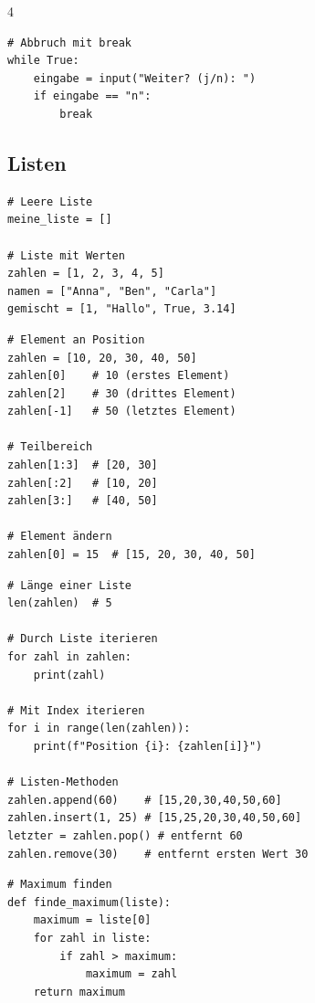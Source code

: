 \begin{landscape}
\begin{multicols*}{4}
\begin{cheatSheetBox}[title=while-Schleife]
\begin{lstlisting}
# Abbruch mit break
while True:
    eingabe = input("Weiter? (j/n): ")
    if eingabe == "n":
        break
\end{lstlisting}
		\end{cheatSheetBox}

		\columnbreak\textcolor{\cheatSheetColor}{\subsection*{Listen}}

		\begin{cheatSheetBox}[title=Listen erstellen]
			\begin{lstlisting}
# Leere Liste
meine_liste = []

# Liste mit Werten
zahlen = [1, 2, 3, 4, 5]
namen = ["Anna", "Ben", "Carla"]
gemischt = [1, "Hallo", True, 3.14]
\end{lstlisting}
		\end{cheatSheetBox}

		\begin{cheatSheetBox}[title=Auf Listen zugreifen]
			\begin{lstlisting}
# Element an Position
zahlen = [10, 20, 30, 40, 50]
zahlen[0]    # 10 (erstes Element)
zahlen[2]    # 30 (drittes Element)
zahlen[-1]   # 50 (letztes Element)

# Teilbereich
zahlen[1:3]  # [20, 30]
zahlen[:2]   # [10, 20]
zahlen[3:]   # [40, 50]

# Element ändern
zahlen[0] = 15  # [15, 20, 30, 40, 50]
\end{lstlisting}
		\end{cheatSheetBox}

		\begin{cheatSheetBox}[title=Listen verarbeiten]
			\begin{lstlisting}
# Länge einer Liste
len(zahlen)  # 5

# Durch Liste iterieren
for zahl in zahlen:
    print(zahl)

# Mit Index iterieren
for i in range(len(zahlen)):
    print(f"Position {i}: {zahlen[i]}")

# Listen-Methoden
zahlen.append(60)    # [15,20,30,40,50,60]
zahlen.insert(1, 25) # [15,25,20,30,40,50,60]
letzter = zahlen.pop() # entfernt 60
zahlen.remove(30)    # entfernt ersten Wert 30
\end{lstlisting}
		\end{cheatSheetBox}

		\begin{cheatSheetBox}[title=Algorithmen mit Listen]
			\begin{lstlisting}
# Maximum finden
def finde_maximum(liste):
    maximum = liste[0]
    for zahl in liste:
        if zahl > maximum:
            maximum = zahl
    return maximum


\end{lstlisting}
\end{cheatSheetBox}
\end{multicols*}
\end{landscape}
